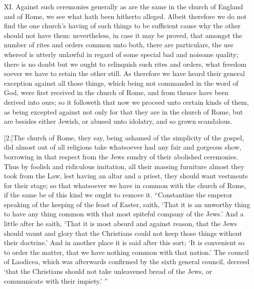 XI. Against such ceremonies generally as are the same in the church of England and of Rome, we see what hath been hitherto alleged. Albeit therefore we do not find the one church’s having of such things to be sufficient cause why the other should not have them: nevertheless, in case it may be proved, that amongst the number of rites and orders common unto both, there are particulars, the use whereof is utterly unlawful in regard of some special bad and noisome quality; there is no doubt but we ought to relinquish such rites and orders, what freedom soever we have to retain the other still. As therefore we have heard their general exception against all those things, which being not commanded in the word of God, were first received in the church of Rome, and from thence have been derived into ours; so it followeth that now we proceed unto certain kinds of them, as being excepted against not only for that they are in the church of Rome, but are besides either Jewish, or abused unto idolatry, and so grown scandalous.

[2.]The church of Rome, they say, being ashamed of the simplicity of the gospel, did almost out of all religions take whatsoever had any fair and gorgeous show, borrowing in that respect from the Jews sundry of their abolished ceremonies. Thus by foolish and ridiculous imitation, all their massing furniture almost they took from the Law, lest having an altar and a priest, they should want vestments for their stage; so that whatsoever we have in common with the church of Rome, if the same be of this kind we ought to remove it. “Constantine the emperor speaking of the keeping of the feast of Easter, saith, ‘That it is an unworthy thing to have any thing common with that most spiteful company of the Jews.’ And a little after he saith, ‘That it is most absurd and against reason, that the Jews should  vaunt and glory that the Christians could not keep those things without their doctrine.’ And in another place it is said after this sort; ‘It is convenient so to order the matter, that we have nothing common with that nation.’ The council of Laodicea, which was afterwards confirmed by the sixth general council, decreed ‘that the Christians should not take unleavened bread of the Jews, or communicate with their impiety.’ ”

